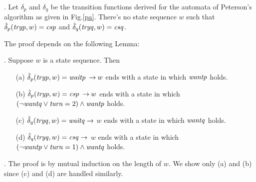 \documentclass[12pt]{article}
\newcommand{\tid}[1]{\mbox{\tt #1\/}}
\newcommand{\id}[1]{\mbox{\it #1\/}}
\newcommand*{\imp}{\mathbin{\rightarrow}}
\begin{document}


\vspace{1em}
.
Let $\delta_p$ and $\delta_q$ be the transition functions derived for the automata
of Peterson's algorithm as given in Fig.\ref{pa}.
There's no state sequence $w$ such that $\hat{\delta}_p(\id{tryp},w)=\id{csp}$ and
$\hat{\delta}_q(\id{tryq},w)=\id{csq}$.

\vspace{1em}
\noindent The proof depends on the following Lemma:

\vspace{1em}
.
Suppose $w$ is a state sequence.  Then
\begin{enumerate}
\item[(a)] $\hat{\delta}_p(\id{tryp},w)=\id{waitp}\; \imp w$ ends with a
state in which $\id{wantp}$ holds.
\item[(b)] $\hat{\delta}_p(\id{tryp},w)=\id{csp}\; \imp w$ ends with a
state in which $(\neg\id{wantq}\vee\id{turn}=2)\wedge\id{wantp}$ holds.

\item[(c)] $\hat{\delta}_q(\id{tryq},w)=\id{waitq}\; \imp$ $w$ ends with a
state in which $\id{wantq}$ holds.
\item[(d)] $\hat{\delta}_q(\id{tryq},w)=\id{csq}\; \imp$ $w$ ends with 
a state in which $(\neg\id{wantp}\vee\id{turn}=1)\wedge\id{wantq}$ holds.
\end{enumerate}

\vspace{1em}
.  The proof is by mutual induction on the length of $w$.
We show only (a) and (b) since (c) and (d) are handled similarly.
\end{document}
